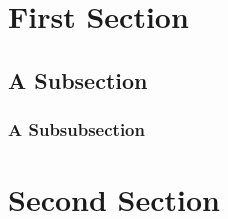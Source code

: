 \documentclass[oneside, english]{reports/assets/sdqtechreport}
\begin{document}
\section{First Section}
\label{sec:SecondContent:FirstSection}

\Blindtext

\subsection{A Subsection}
\label{sec:SecondContent:FirstSubSection}

\Blindtext

\subsubsection{A Subsubsection}

\Blindtext[1]

\section{Second Section}
\label{sec:SecondContent:SecondSection}

\Blindtext

\end{document}
